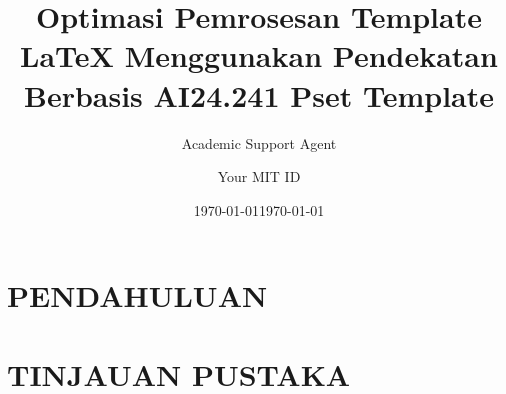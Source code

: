 \documentclass{article}
\title{Optimasi Pemrosesan Template LaTeX Menggunakan Pendekatan Berbasis AI}
\author{Academic Support Agent}
\date{\today}
\begin{document}
\maketitle

\begin{abstract}

\end{abstract}

\chapter{PENDAHULUAN}


\chapter{TINJAUAN PUSTAKA}


\usepackage[utf8]{inputenc}
\usepackage{amsmath}
\usepackage{nd3} %

\title{24.241 Pset Template}
\author{Your MIT ID}
\date{\today}
\end{document}

